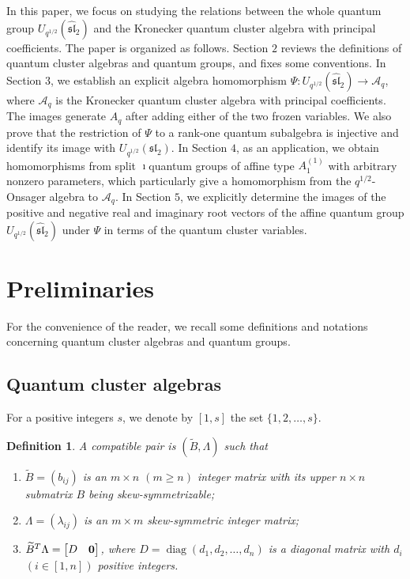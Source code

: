\documentclass[reqno,11pt]{amsart}
\numberwithin{equation}{section}
\newtheorem{definition}[theorem]{Definition}
\begin{document}
In this paper, we focus on studying the relations between  the whole quantum group $U_{q^{1/2}}( {\widehat {\mathfrak{sl}}}_2 )$ and the Kronecker quantum cluster algebra  with principal coefficients. The paper is organized as follows. Section $2$ reviews the definitions of quantum cluster algebras and quantum groups, and fixes some conventions.
In Section $3$,  we establish an explicit algebra homomorphism $\Psi:U_{q^{1/2}}( {{{\widehat {\mathfrak{sl}}}_2}}  )\longrightarrow\mathcal A_q$, where $\mathcal A_q$ is the Kronecker quantum cluster algebra with principal coefficients. The images generate $A_q$ after adding either of the two frozen variables.  We also prove that the restriction of $\Psi$ to a rank-one quantum subalgebra is injective and identify its image  with $U_{q^{1/2}}( {{{ {\mathfrak{sl}}}_2}} )$.
In Section $4$, as an application, we obtain homomorphisms from split $\imath$quantum groups of affine type $A_1^{(1)}$ with arbitrary nonzero parameters, which particularly give a homomorphism from the $q^{1/2}$-Onsager algebra to $\mathcal A_q$.
In Section $5$, we explicitly determine the images of the positive and negative real and imaginary root vectors of the affine quantum group $U_{q^{1/2}}( {{{\widehat {\mathfrak{sl}}}_2}} )$ under $\Psi$ in terms of  the quantum cluster variables.

\section{Preliminaries}
For the convenience of the reader, we recall some  definitions and notations  concerning quantum cluster algebras \cite{AA} and quantum groups.

\subsection{Quantum cluster algebras}
For a positive integers $s$, we denote
by   $[1,s]$  the set $\{1,2,\ldots,s\}$.

\begin{definition}
A compatible pair is  $(\widetilde{B},\Lambda)$ such that
\begin{enumerate}
		\item $\widetilde{B}=(b_{ij})$  is an $m\times n$ $(m\ge n)$ integer matrix with its upper $n\times n$ submatrix  $B$  being skew-symmetrizable;
		\item $\Lambda=(\lambda_{ij})$ is an $m\times m$  skew-symmetric integer matrix;
        \item $\widetilde{B}^{T}\Lambda=\begin{bmatrix} D & {\bf{0}} \end{bmatrix}$, where $D=\operatorname{diag}(d_1, d_2, \dots, d_n)$ is a diagonal matrix
with $d_i$  $(i\in [1,n])$ positive integers.
	\end{enumerate}
 \end{definition}
\end{document}
